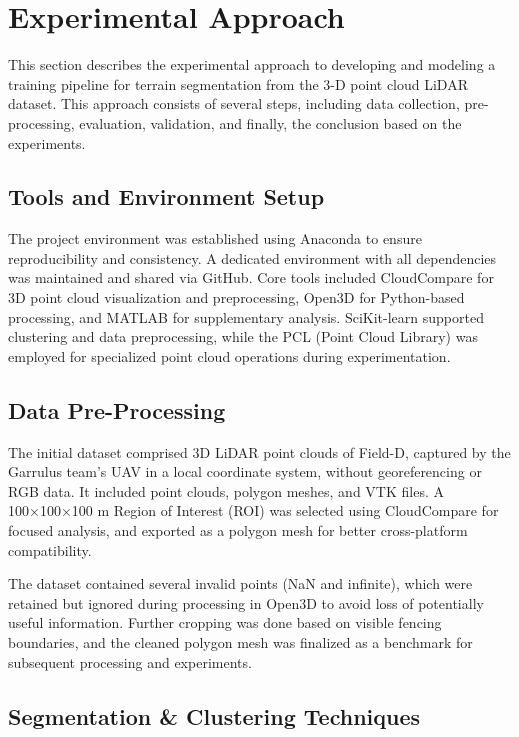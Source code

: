 \documentclass[../report.tex]{subfiles}
\begin{document}
    \section{Experimental Approach}
    This section describes the experimental approach to developing and modeling a training pipeline for terrain segmentation from the 3-D point cloud LiDAR dataset. This approach consists of several steps, including data collection, pre-processing, evaluation, validation, and finally, the conclusion based on the experiments.
    
    \subsection{Tools and Environment Setup}
    The project environment was established using Anaconda to ensure reproducibility and consistency. A dedicated environment with all dependencies was maintained and shared via GitHub\cite{github}. Core tools included CloudCompare\cite{ColoudCompare} for 3D point cloud visualization and preprocessing, Open3D for Python-based processing, and MATLAB\cite{matlab} for supplementary analysis. SciKit-learn supported clustering and data preprocessing, while the PCL (Point Cloud Library)\cite{PCL} was employed for specialized point cloud operations during experimentation.

    \subsection{Data Pre-Processing}
    The initial dataset comprised 3D LiDAR point clouds of Field-D, captured by the Garrulus team’s UAV in a local coordinate system, without georeferencing or RGB data. It included point clouds, polygon meshes, and VTK files. A 100×100×100 m Region of Interest (ROI) was selected using CloudCompare for focused analysis, and exported as a polygon mesh for better cross-platform compatibility.

    The dataset contained several invalid points (NaN and infinite), which were retained but ignored during processing in Open3D to avoid loss of potentially useful information. Further cropping was done based on visible fencing boundaries, and the cleaned polygon mesh was finalized as a benchmark for subsequent processing and experiments.
    
    \subsection{Segmentation & Clustering Techniques}
\end{document}
